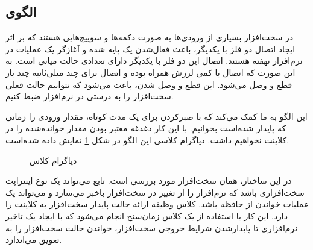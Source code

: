 \subsection{الگوی }
\label{HWDebouncingSec}
\begin{RTL}
در سخت‌افزار بسیاری از ورودی‌ها به صورت دکمه‌ها و سوییچ‌هایی هستند که بر اثر ایجاد
اتصال دو فلز با یکدیگر، باعث فعال‌شدن یک پایه شده و آغازگر یک عملیات در نرم‌افزار
نهفته هستند. اتصال این دو فلز با یکدیگر دارای تعدادی حالت میانی است. به این صورت
که اتصال با کمی لرزش همراه بوده و اتصال برای چند میلی‌ثانیه چند بار قطع و وصل
می‌شود. این قطع و وصل شدن، باعث می‌شود که نتوانیم حالت فعلی سخت‌افزار را به درستی
در نرم‌افزار ضبط کنیم.
\end{RTL}
\begin{RTL}
این الگو به ما کمک می‌کند که با صبرکردن برای یک مدت کوتاه، مقدار ورودی را
زمانی که پایدار شده‌است بخوانیم. با این کار دغدغه معتبر بودن مقدار خوانده‌شده را
در کلاینت نخواهیم داشت. دیاگرام کلاسی این الگو در شکل \ref{HWDebouncingClassDiag}
نمایش داده شده‌است.
\end{RTL}
\begin{figure}[h!]
\centering
{}
\caption{دیاگرام کلاس }
\label{HWDebouncingClassDiag}
\end{figure}
\begin{RTL}
در این ساختار،  همان سخت‌افزار مورد بررسی است.
تابع  می‌تواند یک نوع اینتراپت سخت‌افزاری باشد که نرم‌افزار را
از تغییر در سخت‌افزار باخبر می‌سازد و  می‌تواند یک عملیات
خواندن از حافظه باشد.
کلاس  وظیفه ارائه حالت پایدار سخت‌افزار به کلاینت را دارد.
این کار با استفاده از یک کلاس زمان‌سنج انجام می‌شود که با ایجاد یک تاخیر نرم‌افزاری
تا پایدارشدن شرایط خروجی سخت‌افزار، خواندن حالت سخت‌افزار را به تعویق می‌اندازد.
\end{RTL}